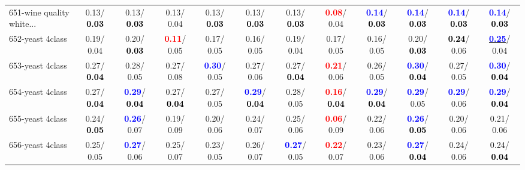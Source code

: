 \begin{table}[h]
\begin{center}
{\begin{tabular}{lc|c|c|c|c|c|c|c|c|c|c}
651-wine quality white... &   0.13/\textcolor{black}{\textbf{  0.03}} &   0.13/\textcolor{black}{\textbf{  0.03}} &   0.13/  0.04 &   0.13/\textcolor{black}{\textbf{  0.03}} &   0.13/\textcolor{black}{\textbf{  0.03}} &   0.13/\textcolor{black}{\textbf{  0.03}} & \textcolor{red}{\textbf{  0.08}}/  0.04 & \textcolor{blue}{\textbf{  0.14}}/\textcolor{black}{\textbf{  0.03}} & \textcolor{blue}{\textbf{  0.14}}/\textcolor{black}{\textbf{  0.03}} & \textcolor{blue}{\textbf{  0.14}}/\textcolor{black}{\textbf{  0.03}} & \textcolor{blue}{\textbf{  0.14}}/\textcolor{black}{\textbf{  0.03}} \\
652-yeast 4class &   0.19/  0.04 &   0.20/\textcolor{black}{\textbf{  0.03}} & \textcolor{red}{\textbf{  0.11}}/  0.05 &   0.17/  0.05 &   0.16/  0.05 &   0.19/  0.04 &   0.17/  0.05 &   0.16/  0.05 &   0.20/\textcolor{black}{\textbf{  0.03}} & \textcolor{black}{\textbf{  0.24}}/  0.06 & \underline{\textcolor{blue}{\textbf{  0.25}}}/  0.04 \\
653-yeast 4class &   0.27/\textcolor{black}{\textbf{  0.04}} &   0.28/  0.05 &   0.27/  0.08 & \textcolor{blue}{\textbf{  0.30}}/  0.05 &   0.27/  0.06 &   0.27/\textcolor{black}{\textbf{  0.04}} & \textcolor{red}{\textbf{  0.21}}/  0.06 &   0.26/  0.05 & \textcolor{blue}{\textbf{  0.30}}/\textcolor{black}{\textbf{  0.04}} &   0.27/  0.05 & \textcolor{blue}{\textbf{  0.30}}/\textcolor{black}{\textbf{  0.04}} \\
654-yeast 4class &   0.27/\textcolor{black}{\textbf{  0.04}} & \textcolor{blue}{\textbf{  0.29}}/\textcolor{black}{\textbf{  0.04}} &   0.27/\textcolor{black}{\textbf{  0.04}} &   0.27/  0.05 & \textcolor{blue}{\textbf{  0.29}}/\textcolor{black}{\textbf{  0.04}} &   0.28/  0.05 & \textcolor{red}{\textbf{  0.16}}/\textcolor{black}{\textbf{  0.04}} & \textcolor{blue}{\textbf{  0.29}}/\textcolor{black}{\textbf{  0.04}} & \textcolor{blue}{\textbf{  0.29}}/  0.05 & \textcolor{blue}{\textbf{  0.29}}/  0.06 & \textcolor{blue}{\textbf{  0.29}}/\textcolor{black}{\textbf{  0.04}} \\ \hline
655-yeast 4class &   0.24/\textcolor{black}{\textbf{  0.05}} & \textcolor{blue}{\textbf{  0.26}}/  0.07 &   0.19/  0.09 &   0.20/  0.06 &   0.24/  0.07 &   0.25/  0.06 & \textcolor{red}{\textbf{  0.06}}/  0.09 &   0.22/  0.06 & \textcolor{blue}{\textbf{  0.26}}/\textcolor{black}{\textbf{  0.05}} &   0.20/  0.06 &   0.21/  0.06 \\
656-yeast 4class &   0.25/  0.05 & \textcolor{blue}{\textbf{  0.27}}/  0.06 &   0.25/  0.07 &   0.23/  0.05 &   0.26/  0.07 & \textcolor{blue}{\textbf{  0.27}}/  0.05 & \textcolor{red}{\textbf{  0.22}}/  0.07 &   0.23/  0.06 & \textcolor{blue}{\textbf{  0.27}}/\textcolor{black}{\textbf{  0.04}} &   0.24/  0.06 &   0.24/\textcolor{black}{\textbf{  0.04}} \\

\end{tabular}}
\end{center}
\end{table}
